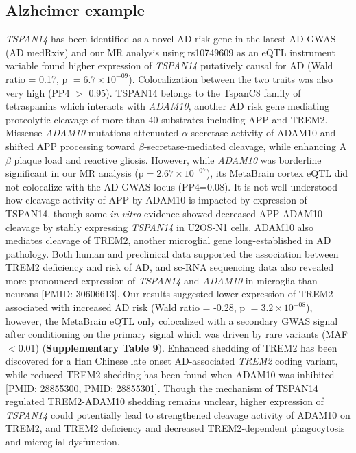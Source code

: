\subsection{Alzheimer example}
\emph{TSPAN14} has been identified as a novel AD risk gene in the latest AD-GWAS (AD medRxiv) and our MR analysis using rs10749609 as an eQTL instrument variable found higher expression of \emph{TSPAN14} putatively causal for AD (Wald ratio = 0.17, p $= 6.7 \times 10^{-09}$). Colocalization between the two traits was also very high (PP4 $>$ 0.95). TSPAN14 belongs to the TspanC8 family of tetraspanins which interacts with \emph{ADAM10}, another AD risk gene mediating proteolytic cleavage of more than 40 substrates including APP and TREM2\cite{matthewsRegulationLeukocytesTspanC82018}. Missense \emph{ADAM10} mutations attenuated $\alpha$-secretase activity of ADAM10 and shifted APP processing toward $\beta$-secretase-mediated cleavage, while enhancing A$\beta$ plaque load and reactive gliosis\cite{suhADAM10MissenseMutations2013}. However, while \emph{ADAM10} was borderline significant in our MR analysis (p$= 2.67 \times 10^{-07}$), its MetaBrain cortex eQTL did not colocalize with the AD GWAS locus (PP4=0.08). It is not well understood how cleavage activity of APP by ADAM10 is impacted by expression of TSPAN14, though some \emph{in vitro} evidence showed decreased APP-ADAM10 cleavage by stably expressing \emph{TSPAN14} in U2OS-N1 cells\cite{jouannetTspanC8TetraspaninsDifferentially2016}. ADAM10 also mediates cleavage of TREM2, another microglial gene long-established in AD pathology\cite{ullandTREM2KeyPlayer2018}. Both human and preclinical data supported the association between TREM2 deficiency and risk of AD\cite{ullandTREM2KeyPlayer2018}, and sc-RNA sequencing data also revealed more pronounced expression of \emph{TSPAN14} and \emph{ADAM10} in microglia than neurons [PMID: 30606613]. Our results suggested lower expression of TREM2 associated with increased AD risk (Wald ratio = -0.28, p $= 3.2 \times 10^{-08}$), however, the MetaBrain eQTL only colocalized with a secondary GWAS signal after conditioning on the primary signal which was driven by rare variants (MAF$<$0.01) (\textbf{Supplementary Table 9}). Enhanced shedding of TREM2 has been discovered for a Han Chinese late onset AD-associated \emph{TREM2} coding variant, while reduced TREM2 shedding has been found when ADAM10 was inhibited [PMID: 28855300, PMID: 28855301]. Though the mechanism of TSPAN14 regulated TREM2-ADAM10 shedding remains unclear, higher expression of \emph{TSPAN14} could potentially lead to strengthened cleavage activity of ADAM10 on TREM2, and TREM2 deficiency and decreased TREM2‐dependent phagocytosis and microglial dysfunction. 

